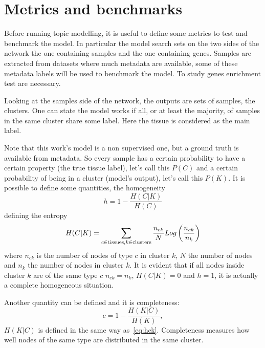 \section{Metrics and benchmarks}
Before running topic modelling, it is useful to define some metrics to test and benchmark the model. In particular the model search sets on the two sides of the network the one containing samples and the one containing genes. Samples are extracted from datasets where much metadata are available, some of these metadata labels will be used to benchmark the model. To study genes enrichment test are necessary.

Looking at the samples side of the network, the outputs are sets of samples, the clusters. One can state the model works if all, or at least the majority, of samples in the same cluster share some label. Here the tissue is considered as the main label.

Note that this work's model is a non supervised one, but a ground truth is available from metadata. So every sample has a certain probability to have a certain property (the true tissue label), let's call this $P(C)$ and a certain probability of being in a cluster (model's output), let's call this $P(K)$.
It is possible to define some quantities, the homogeneity
\begin{equation}\label{eq:homogeneity}
    h=1-\frac{H(C|K)}{H(C)}
\end{equation}
defining the entropy
\begin{equation}\label{eq:hck}
    H(C|K)=\sum_{c\in \mathrm{tissues},\\ k \in \mathrm{clusters}}\frac{n_{c k}}{N}Log\left(\frac{n_{c k}}{n_k}\right)
\end{equation}
where $n_{c k}$ is the number of nodes of type $c$ in cluster $k$, $N$ the number of nodes and $n_k$ the number of nodes in cluster $k$. It is evident that if all nodes inside cluster $k$ are of the same type $c$ $n_{c k}=n_{k}$, $H(C|K)=0$ and $h=1$, it is actually a complete homogeneous situation.

Another quantity can be defined and it is completeness:
\begin{equation}\label{eq:completness}
    c=1-\frac{H(K|C)}{H(K)},
\end{equation}
$H(K|C)$ is defined in the same way as~\ref{eq:hck}. Completeness measures how well nodes of the same type are distributed in the same cluster.

